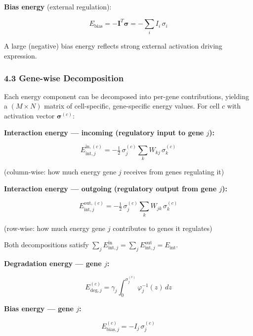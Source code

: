 \documentclass[11pt]{article}
\begin{document}
\textbf{Bias energy} (external regulation):

\begin{equation}
E_{\text{bias}} = -\mathbf{I}^T\boldsymbol{\sigma} = -\sum_i I_i\,\sigma_i 
\end{equation}


A large (negative) bias energy reflects strong external activation driving expression.


\subsubsection*{4.3 Gene-wise Decomposition}

Each energy component can be decomposed into per-gene contributions, yielding a $(M \times N)$ matrix of cell-specific, gene-specific energy values. For cell $c$ with activation vector $\boldsymbol{\sigma}^{(c)}$:

\textbf{Interaction energy — incoming (regulatory input to gene $j$):}

\begin{equation}
E_{\text{int},j}^{\text{in},(c)} = -\tfrac{1}{2}\,\sigma_j^{(c)}\sum_k W_{kj}\,\sigma_k^{(c)} 
\end{equation}

(column-wise: how much energy gene $j$ receives from genes regulating it)

\textbf{Interaction energy — outgoing (regulatory output from gene $j$):}

\begin{equation}
E_{\text{int},j}^{\text{out},(c)} = -\tfrac{1}{2}\,\sigma_j^{(c)}\sum_k W_{jk}\,\sigma_k^{(c)} 
\end{equation}

(row-wise: how much energy gene $j$ contributes to genes it regulates)

Both decompositions satisfy $\sum_j E_{\text{int},j}^{\text{in}} = \sum_j E_{\text{int},j}^{\text{out}} = E_{\text{int}}$.

\textbf{Degradation energy — gene $j$:}

\begin{equation}
E_{\text{deg},j}^{(c)} = \gamma_j \int_0^{\sigma_j^{(c)}} \varphi_j^{-1}(z)\,dz 
\end{equation}


\textbf{Bias energy — gene $j$:}

\begin{equation}
E_{\text{bias},j}^{(c)} = -I_j\,\sigma_j^{(c)} 
\end{equation}
\end{document}
